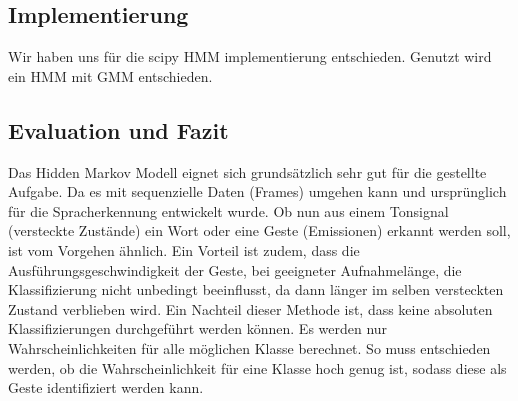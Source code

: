 \subsection{Implementierung}  \label{sec:impl}
Wir haben uns für die scipy HMM implementierung entschieden. 
Genutzt wird ein \acl{HMM} mit \acl{GMM} entschieden.


\subsection{Evaluation und Fazit}  \label{sec:result}
Das Hidden Markov Modell eignet sich grundsätzlich sehr gut für die gestellte Aufgabe. Da es mit sequenzielle Daten (Frames) umgehen 
kann und ursprünglich für die Spracherkennung entwickelt wurde. Ob nun aus einem Tonsignal (versteckte Zustände) ein Wort oder 
eine Geste (Emissionen) erkannt werden soll, ist vom Vorgehen ähnlich. Ein Vorteil ist zudem, dass die Ausführungsgeschwindigkeit
 der Geste, bei geeigneter Aufnahmelänge, die Klassifizierung nicht unbedingt beeinflusst, da dann länger im selben versteckten 
 Zustand verblieben wird.
Ein Nachteil dieser Methode ist, dass keine absoluten Klassifizierungen durchgeführt werden können. Es werden nur Wahrscheinlichkeiten für alle möglichen Klasse berechnet. So muss entschieden werden, ob die Wahrscheinlichkeit für eine Klasse hoch genug ist, sodass diese als Geste identifiziert werden kann.